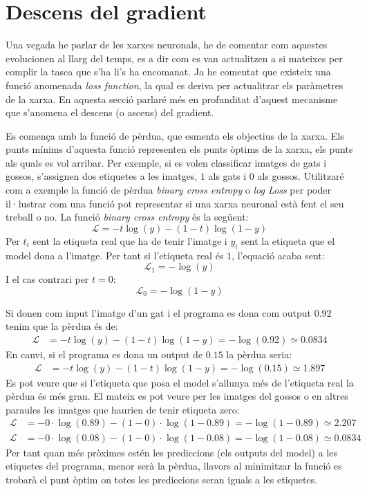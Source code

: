 \section{Descens del gradient}
Una vegada he parlar de les xarxes neuronals, he de comentar com aquestes evolucionen al llarg del temps, es a dir com es van actualitzen a si mateixes per complir la tasca que s'ha li's ha encomanat. Ja he comentat que existeix una funció anomenada \textit{loss function}, la qual es deriva per actualitzar els paràmetres de la xarxa. En aquesta secció parlaré més en profunditat d'aquest mecanisme que s'anomena el descens (o ascens) del gradient.

Es comença amb la funció de pèrdua, que esmenta els objectius de la xarxa. Els punts mínims d'aquesta funció representen els punts òptims de la xarxa, els punts als quals es vol arribar. Per exemple, si es volen classificar imatges de gats i gossos, s'assignen dos etiquetes a les imatges, $1$ als gats i $0$ als gossos. Utilitzaré com a exemple la funció de pèrdua \textit{binary cross entropy} o \textit{log Loss} per poder il·lustrar com una funció pot representar si una xarxa neuronal està fent el seu treball o no. La funció \textit{binary cross entropy} és la següent:
\begin{equation}
	\mathcal{L} = - t\log(y) - (1 - t)\log(1 - y) 
	\label{eq:BCE}
\end{equation}
Per $t_i$ sent la etiqueta real que ha de tenir l'imatge i $y_i$ sent la etiqueta que el model dona a l'imatge. Per tant si l'etiqueta real és $1$, l'equació acaba sent:
$$
\mathcal{L}_1 = - \log(y)
$$
I el cas contrari per $t = 0$:
$$
\mathcal{L}_0 = - \log(1 - y)
$$

Si donen com input l'imatge d'un gat i el programa es dona com output $0.92$ tenim que la pèrdua és de:
\begin{align*}
	\mathcal{L} &= - t\log(y) - (1 - t)\log(1 - y) = - \log(0.92) \simeq 0.0834
\end{align*}
En canvi, si el programa es dona un output de $0.15$ la pèrdua seria:
\begin{align*}
	\mathcal{L} &= - t\log(y) - (1 - t)\log(1 - y) = - \log(0.15) \simeq 1.897
\end{align*}
Es pot veure que si l'etiqueta que posa el model s'allunya més de l'etiqueta real la pèrdua és més gran. El mateix es pot veure per les imatges del gossos o en altres paraules les imatges que haurien de tenir etiqueta zero:
\begin{align*}
	\mathcal{L} &= - 0\cdot\log(0.89) - (1 - 0)\cdot\log(1 - 0.89) = - \log(1- 0.89) \simeq 2.207 \\
	\mathcal{L} &= - 0\cdot\log(0.08) - (1 - 0)\cdot\log(1 - 0.08) = - \log(1- 0.08)\simeq 0.0834
\end{align*}
Per tant quan més pròximes estén les prediccions (els outputs del model) a les etiquetes del programa, menor serà la pèrdua, llavors al minimitzar la funció es trobarà el punt òptim on totes les prediccions seran iguals a les etiquetes.

